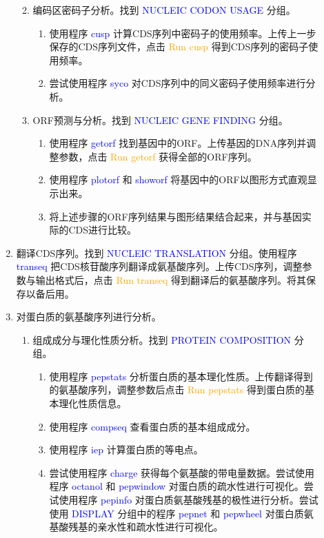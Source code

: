 \begin{description}
\begin{enumerate}
\begin{enumerate}
\begin{enumerate}
						\end{enumerate}
					\item 编码区密码子分析。找到 \textcolor{blue}{NUCLEIC CODON USAGE} 分组。
						\begin{enumerate}
							\item 使用程序 \textcolor{blue}{cusp} 计算CDS序列中密码子的使用频率。上传上一步保存的CDS序列文件，点击 \textcolor{orange}{Run cusp} 得到CDS序列的密码子使用频率。
							\item 尝试使用程序 \textcolor{blue}{syco} 对CDS序列中的同义密码子使用频率进行分析。
						\end{enumerate}
					\item ORF预测与分析。找到 \textcolor{blue}{NUCLEIC GENE FINDING} 分组。
						\begin{enumerate}
							\item 使用程序 \textcolor{blue}{getorf} 找到基因中的ORF。上传基因的DNA序列并调整参数，点击 \textcolor{orange}{Run getorf} 获得全部的ORF序列。
							\item 使用程序 \textcolor{blue}{plotorf} 和 \textcolor{blue}{showorf} 将基因中的ORF以图形方式直观显示出来。
							\item 将上述步骤的ORF序列结果与图形结果结合起来，并与基因实际的CDS进行比较。
						\end{enumerate}
				\end{enumerate}
			\item 翻译CDS序列。找到 \textcolor{blue}{NUCLEIC TRANSLATION} 分组。使用程序 \textcolor{blue}{transeq} 把CDS核苷酸序列翻译成氨基酸序列。上传CDS序列，调整参数与输出格式后，点击 \textcolor{orange}{Run transeq} 得到翻译后的氨基酸序列。将其保存以备后用。
			\item 对蛋白质的氨基酸序列进行分析。
				\begin{enumerate}
					\item 组成成分与理化性质分析。找到 \textcolor{blue}{PROTEIN COMPOSITION} 分组。
						\begin{enumerate}
							\item 使用程序 \textcolor{blue}{pepstats} 分析蛋白质的基本理化性质。上传翻译得到的氨基酸序列，调整参数后点击 \textcolor{orange}{Run pepstats} 得到蛋白质的基本理化性质信息。
							\item 使用程序 \textcolor{blue}{compseq} 查看蛋白质的基本组成成分。
							\item 使用程序 \textcolor{blue}{iep} 计算蛋白质的等电点。
							\item 尝试使用程序 \textcolor{blue}{charge} 获得每个氨基酸的带电量数据。尝试使用程序 \textcolor{blue}{octanol} 和 \textcolor{blue}{pepwindow} 对蛋白质的疏水性进行可视化。尝试使用程序 \textcolor{blue}{pepinfo} 对蛋白质氨基酸残基的极性进行分析。尝试使用 \textcolor{blue}{DISPLAY} 分组中的程序 \textcolor{blue}{pepnet} 和 \textcolor{blue}{pepwheel} 对蛋白质氨基酸残基的亲水性和疏水性进行可视化。

\end{enumerate}
\end{enumerate}
\end{enumerate}
\end{description}
